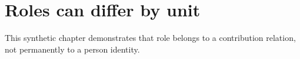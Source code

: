 \chapter{Roles can differ by unit}
This synthetic chapter demonstrates that role belongs to a contribution relation, not permanently to a person identity.
